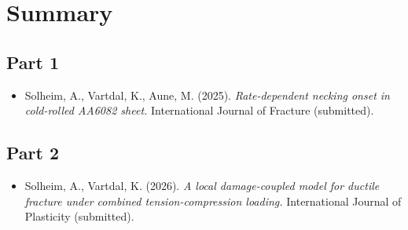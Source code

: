 \chapter{Summary}
\label{Ch:Summary}

\section{Part 1}
\begin{itemize}
    \item[{[1]}] Solheim, A., Vartdal, K., Aune, M. (2025). \textit{Rate-dependent necking onset in cold-rolled AA6082 sheet.} International Journal of Fracture (submitted).
\end{itemize}

\section{Part 2}
\begin{itemize}
    \item[{[2]}] Solheim, A., Vartdal, K. (2026). \textit{A local damage-coupled model for ductile fracture under combined tension-compression loading.} International Journal of Plasticity (submitted).
\end{itemize}
